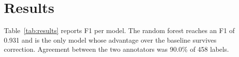 \section{Results}
Table~\ref{tab:results} reports F1 per model. The random forest reaches an F1 of 0.931 and is
the only model whose advantage over the baseline survives correction. Agreement between the two
annotators was 90.0\% of 458 labels.
